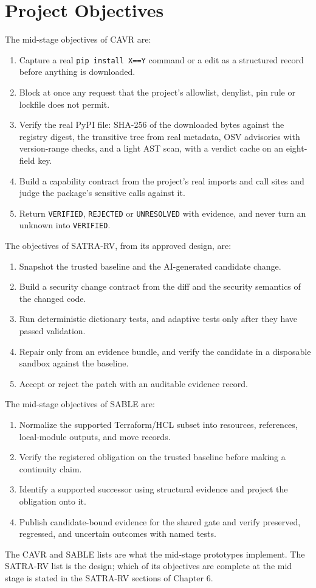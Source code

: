 \section{Project Objectives}
The mid-stage objectives of CAVR are:
\begin{enumerate}
    \item Capture a real \texttt{pip install X==Y} command or a  edit as a structured record before anything is downloaded.
    \item Block at once any request that the project's allowlist, denylist, pin rule or lockfile does not permit.
    \item Verify the real PyPI file: SHA-256 of the downloaded bytes against the registry digest, the transitive tree from real metadata, OSV advisories with version-range checks, and a light AST scan, with a verdict cache on an eight-field key.
    \item Build a capability contract from the project's real imports and call sites and judge the package's sensitive calls against it.
    \item Return \texttt{VERIFIED}, \texttt{REJECTED} or \texttt{UNRESOLVED} with evidence, and never turn an unknown into \texttt{VERIFIED}.
\end{enumerate}
The objectives of SATRA-RV, from its approved design, are:
\begin{enumerate}
    \item Snapshot the trusted baseline and the AI-generated candidate change.
    \item Build a security change contract from the diff and the security semantics of the changed code.
    \item Run deterministic dictionary tests, and adaptive tests only after they have passed validation.
    \item Repair only from an evidence bundle, and verify the candidate in a disposable sandbox against the baseline.
    \item Accept or reject the patch with an auditable evidence record.
\end{enumerate}
The mid-stage objectives of SABLE are:
\begin{enumerate}
    \item Normalize the supported Terraform/HCL subset into resources, references, local-module outputs, and move records.
    \item Verify the registered obligation on the trusted baseline before making a continuity claim.
    \item Identify a supported successor using structural evidence and project the obligation onto it.
    \item Publish candidate-bound evidence for the shared gate and verify preserved, regressed, and uncertain outcomes with named tests.
\end{enumerate}
The CAVR and SABLE lists are what the mid-stage prototypes implement. The SATRA-RV list is the design; which of its objectives are complete at the mid stage is stated in the SATRA-RV sections of Chapter 6.

